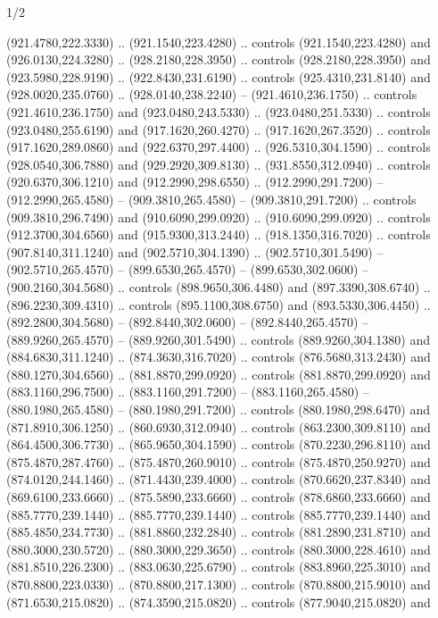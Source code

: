 \begin{flagdescription}{1/2}
\begin{scope}[xshift=0.5\flaglength]
\begin{scope}[scale=0.00148\flagwidth,yshift=237mm,xshift=-252.2mm]
\begin{scope}[y=0.8pt, x=0.8pt, yscale=-1, xscale=1,inner sep=0pt, outer sep=0pt]
  (921.4780,222.3330) .. (921.1540,223.4280) .. controls (921.1540,223.4280) and
  (926.0130,224.3280) .. (928.2180,228.3950) .. controls (928.2180,228.3950) and
  (923.5980,228.9190) .. (922.8430,231.6190) .. controls (925.4310,231.8140) and
  (928.0020,235.0760) .. (928.0140,238.2240) -- (921.4610,236.1750) .. controls
  (921.4610,236.1750) and (923.0480,243.5330) .. (923.0480,251.5330) .. controls
  (923.0480,255.6190) and (917.1620,260.4270) .. (917.1620,267.3520) .. controls
  (917.1620,289.0860) and (922.6370,297.4400) .. (926.5310,304.1590) .. controls
  (928.0540,306.7880) and (929.2920,309.8130) .. (931.8550,312.0940) .. controls
  (920.6370,306.1210) and (912.2990,298.6550) .. (912.2990,291.7200) --
  (912.2990,265.4580) -- (909.3810,265.4580) -- (909.3810,291.7200) .. controls
  (909.3810,296.7490) and (910.6090,299.0920) .. (910.6090,299.0920) .. controls
  (912.3700,304.6560) and (915.9300,313.2440) .. (918.1350,316.7020) .. controls
  (907.8140,311.1240) and (902.5710,304.1390) .. (902.5710,301.5490) --
  (902.5710,265.4570) -- (899.6530,265.4570) -- (899.6530,302.0600) --
  (900.2160,304.5680) .. controls (898.9650,306.4480) and (897.3390,308.6740) ..
  (896.2230,309.4310) .. controls (895.1100,308.6750) and (893.5330,306.4450) ..
  (892.2800,304.5680) -- (892.8440,302.0600) -- (892.8440,265.4570) --
  (889.9260,265.4570) -- (889.9260,301.5490) .. controls (889.9260,304.1380) and
  (884.6830,311.1240) .. (874.3630,316.7020) .. controls (876.5680,313.2430) and
  (880.1270,304.6560) .. (881.8870,299.0920) .. controls (881.8870,299.0920) and
  (883.1160,296.7500) .. (883.1160,291.7200) -- (883.1160,265.4580) --
  (880.1980,265.4580) -- (880.1980,291.7200) .. controls (880.1980,298.6470) and
  (871.8910,306.1250) .. (860.6930,312.0940) .. controls (863.2300,309.8110) and
  (864.4500,306.7730) .. (865.9650,304.1590) .. controls (870.2230,296.8110) and
  (875.4870,287.4760) .. (875.4870,260.9010) .. controls (875.4870,250.9270) and
  (874.0120,244.1460) .. (871.4430,239.4000) .. controls (870.6620,237.8340) and
  (869.6100,233.6660) .. (875.5890,233.6660) .. controls (878.6860,233.6660) and
  (885.7770,239.1440) .. (885.7770,239.1440) .. controls (885.7770,239.1440) and
  (885.4850,234.7730) .. (881.8860,232.2840) .. controls (881.2890,231.8710) and
  (880.3000,230.5720) .. (880.3000,229.3650) .. controls (880.3000,228.4610) and
  (881.8510,226.2300) .. (883.0630,225.6790) .. controls (883.8960,225.3010) and
  (870.8800,223.0330) .. (870.8800,217.1300) .. controls (870.8800,215.9010) and
  (871.6530,215.0820) .. (874.3590,215.0820) .. controls (877.9040,215.0820) and

\end{scope}
\end{scope}
\end{scope}
\end{flagdescription}
